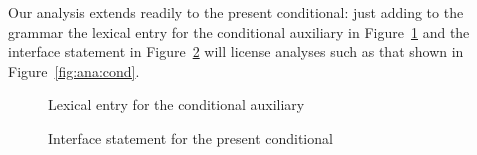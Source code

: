 \documentclass[output=paper]{langsci/langscibook}
\begin{document}
Our analysis extends readily to the present conditional: just adding to the grammar  the lexical entry for the conditional auxiliary in Figure~\ref{fig:aux:cond} and the interface statement in Figure~\ref{fig:cond} will license analyses such as that shown in Figure~\ref{fig:ana:cond}. 

\begin{figure}[p]
\caption{Lexical entry for the conditional auxiliary\label{fig:aux:cond}}
\end{figure}

\begin{figure}[p]
\caption{Interface statement for the present conditional\label{fig:cond}}
\end{figure}
\end{document}
